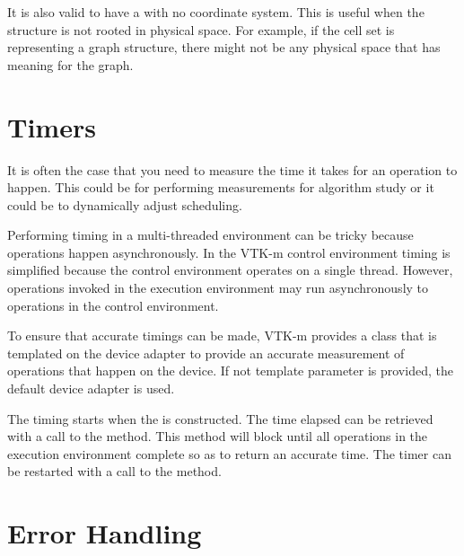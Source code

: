It is also valid to have a  with no coordinate
system. This is useful when the structure is not rooted in physical space.
For example, if the cell set is representing a graph structure, there might
not be any physical space that has meaning for the graph.



\section{Timers}
\label{sec:Timers}


It is often the case that you need to measure the time it takes for an
operation to happen. This could be for performing measurements for
algorithm study or it could be to dynamically adjust scheduling.

Performing timing in a multi-threaded environment can be tricky because
operations happen asynchronously. In the VTK-m control environment timing
is simplified because the control environment operates on a single
thread. However, operations invoked in the execution environment may run
asynchronously to operations in the control environment.

To ensure that accurate timings can be made, VTK-m provides a
 class that is templated on the device adapter to provide
an accurate measurement of operations that happen on the device. If not
template parameter is provided, the default device adapter is used.

The timing starts when the  is constructed. The time
elapsed can be retrieved with a call to the 
method. This method will block until all operations in the execution
environment complete so as to return an accurate time. The timer can be
restarted with a call to the  method.




\section{Error Handling}
\label{sec:ErrorHandlingControl}

